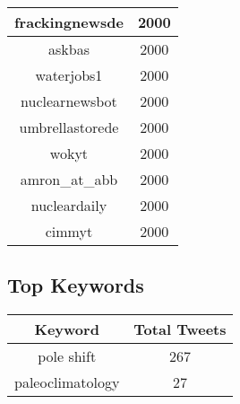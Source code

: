 \documentclass{article}\usepackage[T1]{fontenc}
\begin{document}
\begin{tabular}{|c|c|}
 \hline
frackingnewsde & 2000\\ 
 \hline
askbas & 2000\\ 
 \hline
waterjobs1 & 2000\\ 
 \hline
nuclearnewsbot & 2000\\ 
 \hline
umbrellastorede & 2000\\ 
 \hline
wokyt & 2000\\ 
 \hline
amron\_at\_abb & 2000\\ 
 \hline
nucleardaily & 2000\\ 
 \hline
cimmyt & 2000\\ 
 \hline
\end{tabular}\subsection*{Top Keywords}\begin{tabular}{|c|c|}         \hline         Keyword & Total Tweets \\ 
 \hline
pole shift & 267\\ 
 \hline
paleoclimatology & 27\\ 
 \hline
\end{tabular}
\end{document}
